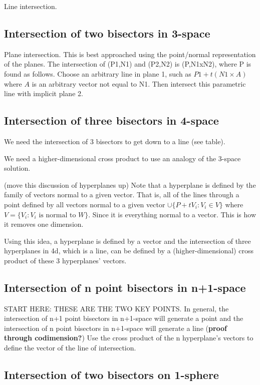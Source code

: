\documentclass[12pt]{article}
\begin{document}
Line intersection.

\subsection{Intersection of two bisectors in 3-space}

Plane intersection.
This is best approached using the point/normal representation of the planes.
The intersection of (P1,N1) and (P2,N2) is (P,N1xN2), where P is found as follows.
Choose an arbitrary line in plane 1, such as $P1 + t(N1 \times A)$ where $A$ is
an arbitrary vector not equal to N1.
Then intersect this parametric line with implicit plane 2.

\subsection{Intersection of three bisectors in 4-space}

We need the intersection of 3 bisectors to get down to a line (see table).

We need a higher-dimensional cross product to use an analogy of the 3-space solution.

(move this discussion of hyperplanes up) 
Note that a hyperplane is defined by the family of vectors normal to a given vector.
That is, all of the lines through a point defined by all vectors normal to a given vector
$\cup \{P + tV_i: V_i \in V \}$ where $V = \{V_i: V_i \mbox{ is normal to } W\}$.
Since it is everything normal to a vector.
This is how it removes one dimension.

Using this idea, a hyperplane is defined by a vector and the intersection
of three hyperplanes in 4d, which is a line, can be defined by a (higher-dimensional)
cross product of these 3 hyperplanes' vectors.

\subsection{Intersection of n point bisectors in n+1-space}

START HERE: THESE ARE THE TWO KEY POINTS.
In general, the intersection of n+1 point bisectors in n+1-space will generate a point
and the intersection of n point bisectors in n+1-space will generate a line 
({\bf proof through codimension?})
Use the cross product of the n hyperplane's vectors to define the vector of the
line of intersection.

\subsection{Intersection of two bisectors on 1-sphere}
\end{document}
